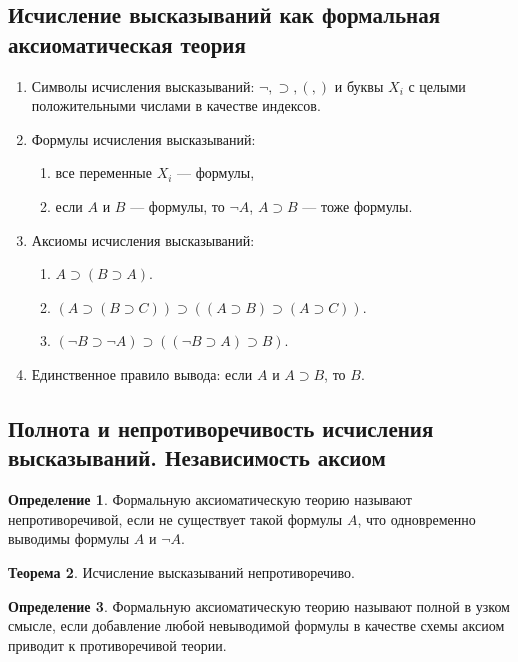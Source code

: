 \documentclass[12pt]{report}
\theoremstyle{definition}
\newtheorem{theorem}{Теорема}[chapter]
\newtheorem{definition}[theorem]{Определение}
\begin{document}
\subsection{Исчисление высказываний как формальная аксиоматическая теория}
\begin{enumerate}
\item Символы исчисления высказываний: $\neg, \supset, (, )$ и буквы $X_i$
  с целыми положительными числами в качестве индексов.

\item Формулы исчисления высказываний:
  \begin{enumerate}
    \item все переменные $X_i$ --- формулы,
    \item если $A$ и $B$ --- формулы, то $\neg A$, $A \supset B$ --- тоже формулы.
  \end{enumerate}

\item Аксиомы исчисления высказываний:
  \begin{enumerate}
    \item $A \supset (B \supset A)$.
    \item $(A \supset (B \supset C)) \supset ((A \supset B) \supset (A \supset C))$.
    \item $(\neg B \supset \neg A) \supset ((\neg B \supset A) \supset B)$.
  \end{enumerate}

\item Единственное правило вывода: если $A$ и
  $A \supset B$, то $B$.
\end{enumerate}

\subsection{Полнота и непротиворечивость исчисления высказываний. Независимость аксиом}

\begin{definition}
Формальную аксиоматическую теорию называют непротиворечивой, если
не существует такой формулы $A$, что одновременно выводимы формулы
$A$ и $\neg A$.
\end{definition}

\begin{theorem}
Исчисление высказываний непротиворечиво.
\end{theorem}

\begin{definition}
Формальную аксиоматическую теорию называют полной в узком смысле,
если добавление любой невыводимой формулы в качестве схемы аксиом
приводит к противоречивой теории.
\end{definition}
\end{document}
